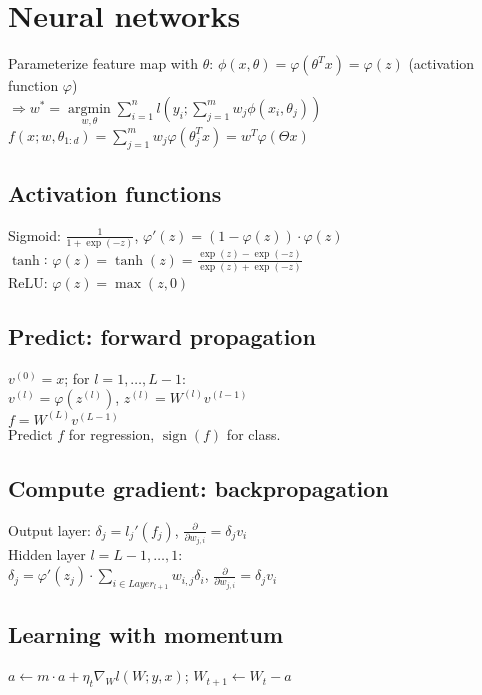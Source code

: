 \section*{Neural networks}
Parameterize feature map with $\theta$: $\phi(x,\theta) = \varphi(\theta^T x) = \varphi(z)$ (activation function $\varphi$)\\
$\Rightarrow w^* = \underset{w, \theta}{\operatorname{argmin}} \sum_{i=1}^n l(y_i; \sum_{j=1}^m w_j \phi(x_i, \theta_j))$\\
$f(x; w, \theta_{1:d}) = \sum_{j=1}^m w_j \varphi(\theta_j^T x) = w^T \varphi(\Theta x)$

\subsection*{Activation functions}
Sigmoid: $\frac{1}{1+\exp(-z)}$,  $\varphi'(z) = (1 - \varphi(z))\cdot\varphi(z)$\\
$\tanh$: $\varphi(z) = \tanh(z) = \frac{\exp(z)-\exp(-z)}{\exp(z)+\exp(-z)}$\\
ReLU:  $\varphi(z) = \max(z,0)$

\subsection*{Predict: forward propagation}
$v^{(0)} = x$; for $l = 1,\ldots,L-1$: \\
$v^{(l)} = \varphi(z^{(l)})$, $z^{(l)} = W^{(l)}v^{(l-1)}$\\
$f = W^{(L)}v^{(L-1)}$\\
Predict $f$ for regression, $\operatorname{sign}(f)$ for class.

\subsection*{Compute gradient: backpropagation}
Output layer: 
$\delta_j = l_j'(f_j)$,
$\frac{\partial}{\partial w_{j,i}} = \delta_j v_i$\\
Hidden layer $l=L-1,\ldots,1$:\\
$\delta_j = \varphi'(z_j) \cdot \sum_{i\in Layer_{l+1}} w_{i,j}\delta_i$,
$\frac{\partial}{\partial w_{j,i}} = \delta_j v_i$

\subsection*{Learning with momentum}
$a \leftarrow m \cdot a + \eta_t \nabla_W l(W;y,x)$; $W_{t+1} \leftarrow W_t - a$

